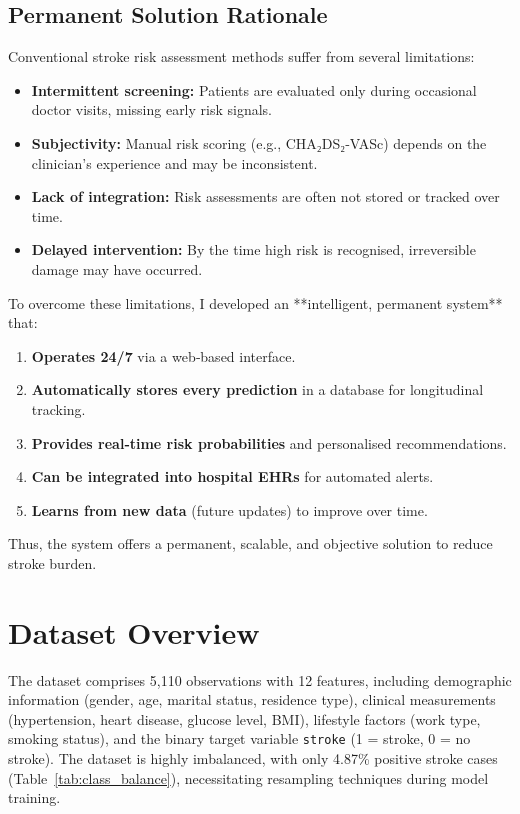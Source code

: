 \documentclass[12pt,a4paper]{article}
\begin{document}
\subsection{Permanent Solution Rationale}
Conventional stroke risk assessment methods suffer from several limitations:
\begin{itemize}
    \item \textbf{Intermittent screening:} Patients are evaluated only during occasional doctor visits, missing early risk signals.
    \item \textbf{Subjectivity:} Manual risk scoring (e.g., CHA₂DS₂‑VASc) depends on the clinician’s experience and may be inconsistent.
    \item \textbf{Lack of integration:} Risk assessments are often not stored or tracked over time.
    \item \textbf{Delayed intervention:} By the time high risk is recognised, irreversible damage may have occurred.
\end{itemize}
To overcome these limitations, I developed an **intelligent, permanent system** that:
\begin{enumerate}
    \item \textbf{Operates 24/7} via a web‑based interface.
    \item \textbf{Automatically stores every prediction} in a database for longitudinal tracking.
    \item \textbf{Provides real‑time risk probabilities} and personalised recommendations.
    \item \textbf{Can be integrated into hospital EHRs} for automated alerts.
    \item \textbf{Learns from new data} (future updates) to improve over time.
\end{enumerate}
Thus, the system offers a permanent, scalable, and objective solution to reduce stroke burden.

\section{Dataset Overview}
The dataset comprises 5,110 observations with 12 features, including demographic information (gender, age, marital status, residence type), clinical measurements (hypertension, heart disease, glucose level, BMI), lifestyle factors (work type, smoking status), and the binary target variable \texttt{stroke} (1 = stroke, 0 = no stroke). The dataset is highly imbalanced, with only 4.87\% positive stroke cases (Table~\ref{tab:class_balance}), necessitating resampling techniques during model training.
\end{document}
